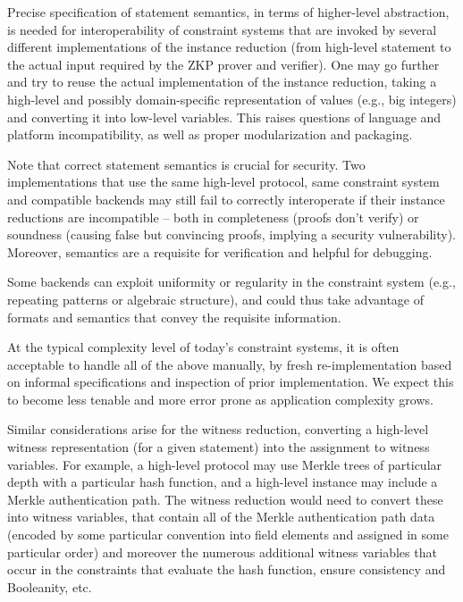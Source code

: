 \documentclass[a4paper,11pt]{article}
\begin{document}
Precise specification of statement semantics, in terms of higher-level abstraction, is needed for interoperability of constraint systems that are invoked by several different implementations of the instance reduction (from high-level statement to the actual input required by the ZKP prover and verifier). One may go further and try to reuse the actual implementation of the instance reduction, taking a high-level and possibly domain-specific representation of values (e.g., big  integers) and converting it into low-level variables. This raises questions of language and platform incompatibility, as well as proper modularization and packaging.

Note that correct statement semantics is crucial for security. Two implementations that use the same high-level protocol, same constraint system and compatible backends may still fail to correctly interoperate if their instance reductions are incompatible -- both in completeness (proofs don’t verify) or soundness (causing false but convincing proofs, implying a security vulnerability). Moreover, semantics are a requisite for verification and helpful for debugging.

Some backends can exploit uniformity or regularity in the constraint system (e.g., repeating patterns or algebraic structure), and could thus take advantage of formats and semantics that convey the requisite information.

At the typical complexity level of today’s constraint systems, it is often acceptable to handle all of the above manually, by fresh re-implementation based on informal specifications and inspection of prior implementation. We expect this to become less tenable and more error prone as application complexity grows.

Similar considerations arise for the witness reduction, converting a high-level witness representation (for a given statement) into the assignment to witness variables. For example, a high-level protocol may use Merkle trees of particular depth with a particular hash function, and a high-level instance may include a Merkle authentication path. The witness reduction would need to convert these into witness variables, that contain all of the Merkle authentication path data (encoded by some particular convention into field elements and assigned in some particular order) and moreover the numerous additional witness variables that occur in the constraints that evaluate the hash function, ensure consistency and Booleanity, etc.
\end{document}
